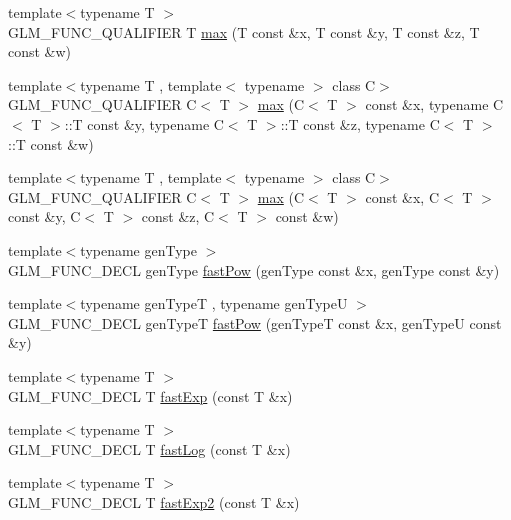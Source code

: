 \begin{DoxyCompactItemize}
\item 
{\footnotesize template$<$typename T $>$ }\\G\-L\-M\-\_\-\-F\-U\-N\-C\-\_\-\-Q\-U\-A\-L\-I\-F\-I\-E\-R T \hyperlink{group__gtx__extented__min__max_ga78e04a0cef1c4863fcae1a2130500d87}{max} (T const \&x, T const \&y, T const \&z, T const \&w)
\item 
{\footnotesize template$<$typename T , template$<$ typename $>$ class C$>$ }\\G\-L\-M\-\_\-\-F\-U\-N\-C\-\_\-\-Q\-U\-A\-L\-I\-F\-I\-E\-R C$<$ T $>$ \hyperlink{group__gtx__extented__min__max_ga7cca8b53cfda402040494cdf40fbdf4a}{max} (C$<$ T $>$ const \&x, typename C$<$ T $>$\-::T const \&y, typename C$<$ T $>$\-::T const \&z, typename C$<$ T $>$\-::T const \&w)
\item 
{\footnotesize template$<$typename T , template$<$ typename $>$ class C$>$ }\\G\-L\-M\-\_\-\-F\-U\-N\-C\-\_\-\-Q\-U\-A\-L\-I\-F\-I\-E\-R C$<$ T $>$ \hyperlink{group__gtx__extented__min__max_gaacffbc466c2d08c140b181e7fd8a4858}{max} (C$<$ T $>$ const \&x, C$<$ T $>$ const \&y, C$<$ T $>$ const \&z, C$<$ T $>$ const \&w)
\item 
{\footnotesize template$<$typename gen\-Type $>$ }\\G\-L\-M\-\_\-\-F\-U\-N\-C\-\_\-\-D\-E\-C\-L gen\-Type \hyperlink{group__gtx__fast__exponential_ga842ec5e981c76f8aae7ae14972795378}{fast\-Pow} (gen\-Type const \&x, gen\-Type const \&y)
\item 
{\footnotesize template$<$typename gen\-Type\-T , typename gen\-Type\-U $>$ }\\G\-L\-M\-\_\-\-F\-U\-N\-C\-\_\-\-D\-E\-C\-L gen\-Type\-T \hyperlink{group__gtx__fast__exponential_ga08af6240d87ce7b9851c9095808c1eb8}{fast\-Pow} (gen\-Type\-T const \&x, gen\-Type\-U const \&y)
\item 
{\footnotesize template$<$typename T $>$ }\\G\-L\-M\-\_\-\-F\-U\-N\-C\-\_\-\-D\-E\-C\-L T \hyperlink{group__gtx__fast__exponential_ga22a548f1bf42c53898c140e56af16529}{fast\-Exp} (const T \&x)
\item 
{\footnotesize template$<$typename T $>$ }\\G\-L\-M\-\_\-\-F\-U\-N\-C\-\_\-\-D\-E\-C\-L T \hyperlink{group__gtx__fast__exponential_ga0130dd03ca124c27dc2094de7ee47e8a}{fast\-Log} (const T \&x)
\item 
{\footnotesize template$<$typename T $>$ }\\G\-L\-M\-\_\-\-F\-U\-N\-C\-\_\-\-D\-E\-C\-L T \hyperlink{group__gtx__fast__exponential_ga62216328ac3af1811add813d0804437d}{fast\-Exp2} (const T \&x)

\end{DoxyCompactItemize}

